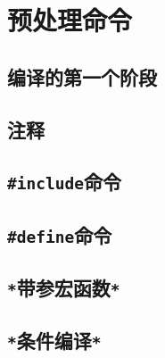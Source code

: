 \chapter{预处理命令} \label{预处理命令}
    \section{编译的第一个阶段}
    \section{注释}
    \section{\texttt{\#include}命令}
    \section{\texttt{\#define}命令}
    \section{\texttt{*}带参宏函数\texttt{*}}
    \section{\texttt{*}条件编译\texttt{*}}